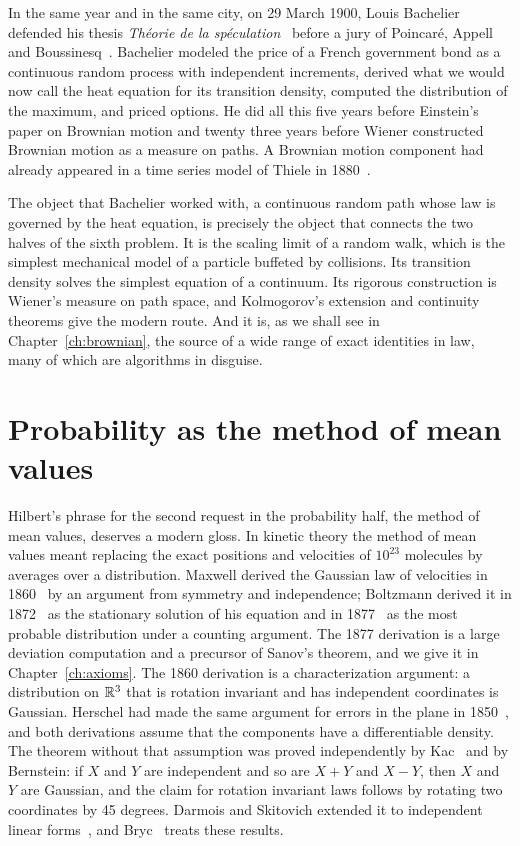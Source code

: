 In the same year and in the same city, on 29 March 1900, Louis Bachelier defended his thesis \emph{Th\'eorie de la sp\'eculation}~\cite{bachelier1900} before a jury of Poincar\'e, Appell and Boussinesq~\cite{courtault2000}. Bachelier modeled the price of a French government bond as a continuous random process with independent increments, derived what we would now call the heat equation for its transition density, computed the distribution of the maximum, and priced options. He did all this five years before Einstein's paper on Brownian motion and twenty three years before Wiener constructed Brownian motion as a measure on paths. A Brownian motion component had already appeared in a time series model of Thiele in 1880~\cite{lauritzen1981}.

The object that Bachelier worked with, a continuous random path whose law is governed by the heat equation, is precisely the object that connects the two halves of the sixth problem. It is the scaling limit of a random walk, which is the simplest mechanical model of a particle buffeted by collisions. Its transition density solves the simplest equation of a continuum. Its rigorous construction is Wiener's measure on path space, and Kolmogorov's extension and continuity theorems give the modern route. And it is, as we shall see in Chapter~\ref{ch:brownian}, the source of a wide range of exact identities in law, many of which are algorithms in disguise.

\section{Probability as the method of mean values}

Hilbert's phrase for the second request in the probability half, the method of mean values, deserves a modern gloss. In kinetic theory the method of mean values meant replacing the exact positions and velocities of $10^{23}$ molecules by averages over a distribution. Maxwell derived the Gaussian law of velocities in 1860~\cite{maxwell1860} by an argument from symmetry and independence; Boltzmann derived it in 1872~\cite{boltzmann1872} as the stationary solution of his equation and in 1877~\cite{boltzmann1877} as the most probable distribution under a counting argument. The 1877 derivation is a large deviation computation and a precursor of Sanov's theorem, and we give it in Chapter~\ref{ch:axioms}. The 1860 derivation is a characterization argument: a distribution on $\mathbb{R}^3$ that is rotation invariant and has independent coordinates is Gaussian. Herschel had made the same argument for errors in the plane in 1850~\cite{herschel1850}, and both derivations assume that the components have a differentiable density. The theorem without that assumption was proved independently by Kac~\cite{kac1939} and by Bernstein: if $X$ and $Y$ are independent and so are $X+Y$ and $X-Y$, then $X$ and $Y$ are Gaussian, and the claim for rotation invariant laws follows by rotating two coordinates by 45 degrees. Darmois and Skitovich extended it to independent linear forms~\cite{darmois1953,skitovich1953}, and Bryc~\cite[Chapters~5 and~6]{bryc1995} treats these results.

